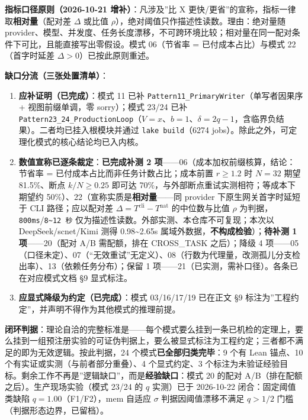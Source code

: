 \textbf{指标口径原则（2026-10-21 增补）}：凡涉及''比 X
更快/更省''的宣称，指标一律取\textbf{相对量}（配对差 \(\Delta\) 或比值
\(\rho\)），绝对阈值只作描述性读数。理由：绝对量随
provider、模型、并发度、任务长度漂移，不可跨环境比较；相对量在同一配对条件下可比，且能直接写出零假设。模式
06（节省率 = 已付成本占比）与模式 22（首字时延差
\(\Delta>0\)）已按此原则重述。

\textbf{缺口分流（三张处置清单）}：

\begin{enumerate}
\def\labelenumi{\arabic{enumi}.}
\tightlist
\item
  \textbf{应补证明（已完成）}：模式 11 已补
  \texttt{Pattern11\_PrimaryWriter}（单写者因果序 + 视图前缀单调，零
  sorry）；模式 23/24 已补
  \texttt{Pattern23\_24\_ProductionLoop}（\(V=x\)、\(b=1\)、\(\delta=2q-1\)，含临界负结果）。二者均已挂入根模块并通过
  \texttt{lake\ build}（6274
  jobs）。除此之外，可定理化模式的核心结论均已入内核。
\item
  \textbf{数值宣称已逐条裁定}：\textbf{已完成补测 2
  项}------06（成本加权前缀核算，结论：节省率 =
  已付成本占比而非任务计数占比；成本前置 \(r\ge1.2\) 时 \(N=32\) 期望
  81.5\%、断点 \(k/N\ge0.25\) 即可达
  70\%，与外部断点重试实测相符；等成本下期望约
  50\%）、22（宣称实质是\textbf{相对量}------同 provider
  下原生网关首字时延短于 CLI 路径；应以配对差
  \(\Delta=T^{\text{cli}}-T^{\text{nat}}\) 的中位数与比值 \(\rho\)
  为判据，\texttt{800ms}/\texttt{8\textasciitilde{}12\ 秒}
  仅为描述性读数。外部实测、本仓库不可复现；本次以 DeepSeek/scnet/Kimi
  测得 0.98\textasciitilde2.65s
  属域外数据，\textbf{不构成检验}）；\textbf{待补测 1 项}------20（配对
  A/B 需配额，排在 CROSS\_TASK 之后）；降级 4
  项------05（口径未定）、07（``无效重试''无定义）、08（行数为代理量，改测孤儿分支检出率）、13（依赖任务分布）；保留
  1 项------21（已实测，需补口径）。各条已在对应模式文档 §9 显式标注。
\item
  \textbf{应显式降级为约定（已完成）}：模式 03/16/17/19 已在正文 §9
  标注为''工程约定''，并声明不得作为其他模式的推理前提。
\end{enumerate}

\textbf{闭环判据}：理论自洽的完整标准是------每个模式要么挂到一条已机检的定理上，要么挂到一组预注册实验的可证伪判据上，要么被显式标注为工程约定；三者都不满足的即为无效逻辑。按此判据，24
个模式\textbf{已全部归类完毕}：9 个有 Lean 锚点、10
个有实证或实测（与前者部分重叠）、4 个显式约定、3
个标注为未验证经验目标。剩余工作不再是''逻辑缺口''，而是\textbf{经验缺口}：模式
20 的配对 A/B（排在配额之后）。生产现场实验（模式 23/24 的 \(q\)
实测）已于 2026-10-22 闭合：固定阈值类缺陷 \(q=1.00\)（F1/F2），mem
自适应 \(\sigma\) 判据因阈值漂移不满足 \(q>1/2\)
门槛（判据形态边界，已留档）。
